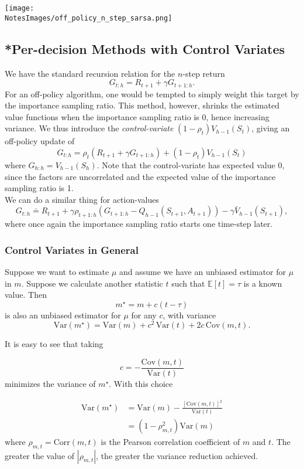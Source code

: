 \texttt{[image: \\NotesImages/off\_policy\_n\_step\_sarsa.png]}\\

\subsection{*Per-decision Methods with Control Variates}
We have the standard recursion relation for the $n$-step return
\[
    G_{t:h} = R_{t+1} + \gamma G_{t+1:h}.
\]
For an off-policy algorithm, one would be tempted to simply weight this target by the importance sampling ratio. This method, however, shrinks the estimated value functions when the importance sampling ratio is 0, hence increasing variance. We thus introduce the \emph{control-variate} $(1 - \rho_t)V_{h-1}(S_t)$, giving an off-policy update of 
\[
    G_{t:h} = \rho_t (R_{t+1} + \gamma G_{t+1:h}) + (1 - \rho_t)V_{h-1}(S_t)
\]
where $G_{h:h} = V_{h-1}(S_h)$. Note that the control-variate has expected value 0, since the factors are uncorrelated and the expected value of the importance sampling ratio is 1.\\

We can do a similar thing for action-values
\[
    G_{t:h} \doteq R_{t+1} + \gamma \rho_{t+1:h}\left( G_{t+1:h} - Q_{h-1}(S_{t+1}, A_{t+1}) \right) - \gamma \bar{V}_{h-1}(S_{t+1}),
\]
where once again the importance sampling ratio starts one time-step later.

\subsubsection*{Control Variates in General}
Suppose we want to estimate $\mu$ and assume we have an unbiased estimator for $\mu$ in $m$. Suppose we calculate another statistic $t$ such that $\mathbb{E}\left[t\right]=\tau$ is a known value. Then
\[
    m^\star = m + c\left(t-\tau\right)
\]
is also an unbiased estimator for $\mu$ for any $c$, with variance
\[
    \textrm{Var}\left(m^{\star}\right)=\textrm{Var}\left(m\right) + c^2\,\textrm{Var}\left(t\right) + 2c\,\textrm{Cov}\left(m,t\right).
\]

It is easy to see that taking

\[
    c = - \frac{\textrm{Cov}\left(m,t\right)}{\textrm{Var}\left(t\right)}
\]
minimizes the variance of $m^{\star}$. With this choice

\begin{align}
\textrm{Var}(m^{\star}) & =\textrm{Var}(m) - \frac{\left[\textrm{Cov}(m,t)\right]^2}{\textrm{Var}(t)} \\
& = (1-\rho_{m,t}^2)\textrm{Var}(m)
\end{align}
where $\rho_{m,t}=\textrm{Corr}\left(m,t\right) $ is the Pearson correlation coefficient of $m$ and $t$. The greater the value of $|\rho_{m,t}|$, the greater the variance reduction achieved.

